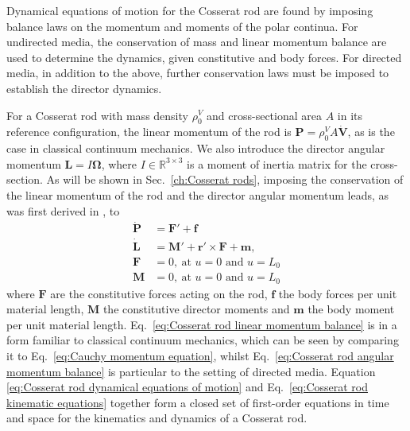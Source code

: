 Dynamical equations of motion for the Cosserat rod are found by imposing balance laws on the momentum and moments of the polar continua. For undirected media, the conservation of mass and linear momentum balance are used to determine the dynamics, given constitutive and body forces. For directed media, in addition to the above, further conservation laws must be imposed to establish the director dynamics.

For a Cosserat rod with mass density $\rho_0^V$ and cross-sectional area $A$ in its reference configuration, the linear momentum of the rod is $\mathbf{P} = \rho^V_0 A \dot{\mathbf{V}}$, as is the case in classical continuum mechanics. We also introduce the director angular momentum $\mathbf{L} = I \boldsymbol{\Omega}$, where $I \in \mathbb{R}^{3 \times 3}$ is a moment of inertia matrix for the cross-section. As will be shown in Sec.~\ref{ch:Cosserat rods}, imposing the conservation of the linear momentum of the rod and the director angular momentum leads, as was first derived in \citep{cosseratTheoryDeformableBodies1909}, to
\begin{subequations} \label{eq:Cosserat rod dynamical equations of motion}
  \begin{align}
\dot{\mathbf{P}} & = \mathbf{F}' + \mathbf{f} \label{eq:Cosserat rod linear momentum balance} \\
\dot{\mathbf{L}} & = \mathbf{M}' + \mathbf{r}' \times \mathbf{F} + \mathbf{m}, \label{eq:Cosserat rod angular momentum balance} \\
\mathbf{F} & = 0,\ \text{at } u=0 \text{ and } u=L_0 \label{eq:Cosserat rod F bc}  \\
\mathbf{M} & = 0,\ \text{at } u=0 \text{ and } u=L_0 \label{eq:Cosserat rod M bc}
  \end{align}
\end{subequations}
where $\mathbf{F}$ are the constitutive forces acting on the rod, $\mathbf{f}$ the body forces per unit material length, $\mathbf{M}$ the constitutive director moments and $\mathbf{m}$ the body moment per unit material length. Eq.~\ref{eq:Cosserat rod linear momentum balance} is in a form familiar to classical continuum mechanics, which can be seen by comparing it to Eq.~\ref{eq:Cauchy momentum equation}, whilst Eq.~\ref{eq:Cosserat rod angular momentum balance} is particular to the setting of directed media. Equation \ref{eq:Cosserat rod dynamical equations of motion} and Eq.~\ref{eq:Cosserat rod kinematic equations} together form a closed set of first-order equations in time and space for the kinematics and dynamics of a Cosserat rod.

